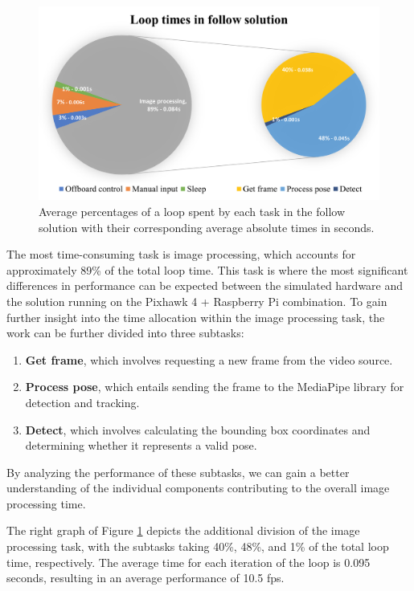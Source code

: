 \begin{figure}[H]
  \centering
  \includegraphics[width=.9\textwidth, keepaspectratio]{img/sitl-performance.png}
  \caption{Average percentages of a loop spent by each task in the follow solution with their corresponding average absolute times in seconds.}
  \label{fig:perf-sitl-sim}
\end{figure}


The most time-consuming task is image processing, which accounts for approximately 89\% of the total loop time. This task is where the most significant differences in performance can be expected between the simulated hardware and the solution running on the Pixhawk 4 + Raspberry Pi combination. To gain further insight into the time allocation within the image processing task, the work can be further divided into three subtasks:
\begin{enumerate}
    \item \textbf{Get frame}, which involves requesting a new frame from the video source.
    \item \textbf{Process pose}, which entails sending the frame to the MediaPipe library for detection and tracking.
    \item \textbf{Detect}, which involves calculating the bounding box coordinates and determining whether it represents a valid pose.
\end{enumerate}
By analyzing the performance of these subtasks, we can gain a better understanding of the individual components contributing to the overall image processing time.

The right graph of Figure \ref{fig:perf-sitl-sim} depicts the additional division of the image processing task, with the subtasks taking 40\%, 48\%, and 1\% of the total loop time, respectively. The average time for each iteration of the loop is 0.095 seconds, resulting in an average performance of 10.5 \acrfull{fps}.


